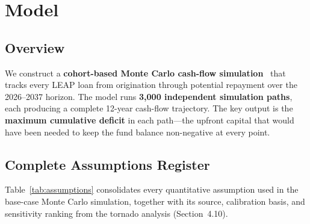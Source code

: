 \documentclass[11pt, letterpaper]{article}
\begin{document}
\section{Model}
\label{sec:model}

\subsection{Overview}

We construct a \textbf{cohort-based Monte Carlo cash-flow simulation}~\cite{glasserman2003} that tracks every LEAP loan from origination through potential repayment over the 2026--2037 horizon. The model runs \textbf{3{,}000 independent simulation paths}, each producing a complete 12-year cash-flow trajectory. The key output is the \textbf{maximum cumulative deficit} in each path---the upfront capital that would have been needed to keep the fund balance non-negative at every point.

\subsection{Complete Assumptions Register}

Table~\ref{tab:assumptions} consolidates every quantitative assumption used in the base-case Monte Carlo simulation, together with its source, calibration basis, and sensitivity ranking from the tornado analysis (Section~4.10).
\end{document}
